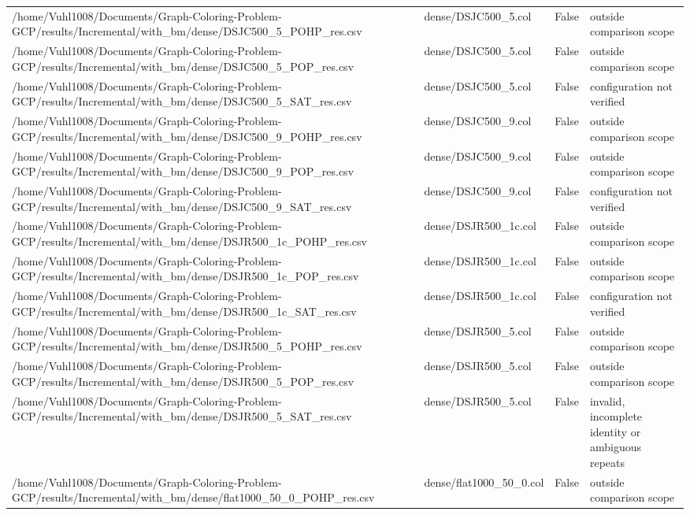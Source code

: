 \begin{table}[htbp]
\begin{tabular}{llll}
/home/Vuhl1008/Documents/Graph-Coloring-Problem-GCP/results/Incremental/with\_bm/dense/DSJC500\_5\_POHP\_res.csv & dense/DSJC500\_5.col & False & outside comparison scope \\
/home/Vuhl1008/Documents/Graph-Coloring-Problem-GCP/results/Incremental/with\_bm/dense/DSJC500\_5\_POP\_res.csv & dense/DSJC500\_5.col & False & outside comparison scope \\
/home/Vuhl1008/Documents/Graph-Coloring-Problem-GCP/results/Incremental/with\_bm/dense/DSJC500\_5\_SAT\_res.csv & dense/DSJC500\_5.col & False & configuration not verified \\
/home/Vuhl1008/Documents/Graph-Coloring-Problem-GCP/results/Incremental/with\_bm/dense/DSJC500\_9\_POHP\_res.csv & dense/DSJC500\_9.col & False & outside comparison scope \\
/home/Vuhl1008/Documents/Graph-Coloring-Problem-GCP/results/Incremental/with\_bm/dense/DSJC500\_9\_POP\_res.csv & dense/DSJC500\_9.col & False & outside comparison scope \\
/home/Vuhl1008/Documents/Graph-Coloring-Problem-GCP/results/Incremental/with\_bm/dense/DSJC500\_9\_SAT\_res.csv & dense/DSJC500\_9.col & False & configuration not verified \\
/home/Vuhl1008/Documents/Graph-Coloring-Problem-GCP/results/Incremental/with\_bm/dense/DSJR500\_1c\_POHP\_res.csv & dense/DSJR500\_1c.col & False & outside comparison scope \\
/home/Vuhl1008/Documents/Graph-Coloring-Problem-GCP/results/Incremental/with\_bm/dense/DSJR500\_1c\_POP\_res.csv & dense/DSJR500\_1c.col & False & outside comparison scope \\
/home/Vuhl1008/Documents/Graph-Coloring-Problem-GCP/results/Incremental/with\_bm/dense/DSJR500\_1c\_SAT\_res.csv & dense/DSJR500\_1c.col & False & configuration not verified \\
/home/Vuhl1008/Documents/Graph-Coloring-Problem-GCP/results/Incremental/with\_bm/dense/DSJR500\_5\_POHP\_res.csv & dense/DSJR500\_5.col & False & outside comparison scope \\
/home/Vuhl1008/Documents/Graph-Coloring-Problem-GCP/results/Incremental/with\_bm/dense/DSJR500\_5\_POP\_res.csv & dense/DSJR500\_5.col & False & outside comparison scope \\
/home/Vuhl1008/Documents/Graph-Coloring-Problem-GCP/results/Incremental/with\_bm/dense/DSJR500\_5\_SAT\_res.csv & dense/DSJR500\_5.col & False & invalid, incomplete identity or ambiguous repeats \\
/home/Vuhl1008/Documents/Graph-Coloring-Problem-GCP/results/Incremental/with\_bm/dense/flat1000\_50\_0\_POHP\_res.csv & dense/flat1000\_50\_0.col & False & outside comparison scope \\

\end{tabular}
\end{table}
